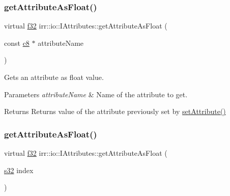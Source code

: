 \subsubsection{\texorpdfstring{get\+Attribute\+As\+Float()}{getAttributeAsFloat()}\hspace{0.1cm}{\footnotesize\ttfamily [1/2]}}
{\footnotesize\ttfamily virtual \hyperlink{namespaceirr_a0277be98d67dc26ff93b1a6a1d086b07}{f32} irr\+::io\+::\+I\+Attributes\+::get\+Attribute\+As\+Float (\begin{DoxyParamCaption}\item[{const \hyperlink{namespaceirr_a9395eaea339bcb546b319e9c96bf7410}{c8} $\ast$}]{attribute\+Name }\end{DoxyParamCaption})\hspace{0.3cm}{\ttfamily [pure virtual]}}



Gets an attribute as float value. 


\begin{DoxyParams}{Parameters}
{\em attribute\+Name} & Name of the attribute to get. \\
\hline
\end{DoxyParams}
\begin{DoxyReturn}{Returns}
Returns value of the attribute previously set by \hyperlink{classirr_1_1io_1_1IAttributes_a03fa31acb481ae23678676cc183f09a6}{set\+Attribute()} 
\end{DoxyReturn}
\mbox{\label{classirr_1_1io_1_1IAttributes_a9ef1a4d52b39daa2f0645df4eb8f40a9}} 
\subsubsection{\texorpdfstring{get\+Attribute\+As\+Float()}{getAttributeAsFloat()}\hspace{0.1cm}{\footnotesize\ttfamily [2/2]}}
{\footnotesize\ttfamily virtual \hyperlink{namespaceirr_a0277be98d67dc26ff93b1a6a1d086b07}{f32} irr\+::io\+::\+I\+Attributes\+::get\+Attribute\+As\+Float (\begin{DoxyParamCaption}\item[{\hyperlink{namespaceirr_ac66849b7a6ed16e30ebede579f9b47c6}{s32}}]{index }\end{DoxyParamCaption})\hspace{0.3cm}{\ttfamily [pure virtual]}}



